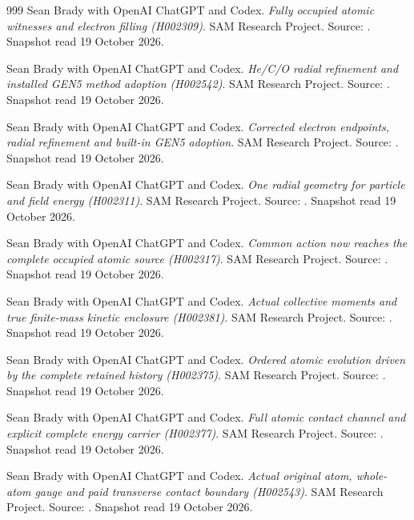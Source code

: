\begin{thebibliography}{999}
 Sean Brady with OpenAI ChatGPT and Codex. \emph{Fully occupied atomic witnesses and electron filling (H002309)}. SAM Research Project. Source: . Snapshot read 19 October 2026.

 Sean Brady with OpenAI ChatGPT and Codex. \emph{He/C/O radial refinement and installed GEN5 method adoption (H002542)}. SAM Research Project. Source: . Snapshot read 19 October 2026.

 Sean Brady with OpenAI ChatGPT and Codex. \emph{Corrected electron endpoints, radial refinement and built-in GEN5 adoption}. SAM Research Project. Source: . Snapshot read 19 October 2026.

 Sean Brady with OpenAI ChatGPT and Codex. \emph{One radial geometry for particle and field energy (H002311)}. SAM Research Project. Source: . Snapshot read 19 October 2026.

 Sean Brady with OpenAI ChatGPT and Codex. \emph{Common action now reaches the complete occupied atomic source (H002317)}. SAM Research Project. Source: . Snapshot read 19 October 2026.

 Sean Brady with OpenAI ChatGPT and Codex. \emph{Actual collective moments and true finite-mass kinetic enclosure (H002381)}. SAM Research Project. Source: . Snapshot read 19 October 2026.

 Sean Brady with OpenAI ChatGPT and Codex. \emph{Ordered atomic evolution driven by the complete retained history (H002375)}. SAM Research Project. Source: . Snapshot read 19 October 2026.

 Sean Brady with OpenAI ChatGPT and Codex. \emph{Full atomic contact channel and explicit complete energy carrier (H002377)}. SAM Research Project. Source: . Snapshot read 19 October 2026.

 Sean Brady with OpenAI ChatGPT and Codex. \emph{Actual original atom, whole-atom gauge and paid transverse contact boundary (H002543)}. SAM Research Project. Source: . Snapshot read 19 October 2026.


\end{thebibliography}
